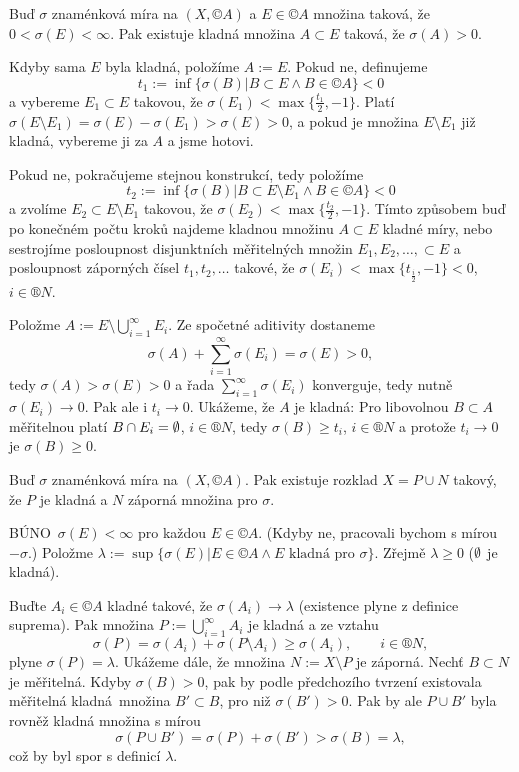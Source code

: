 \documentclass[12pt]{article}					%
\begin{document}
\begin{tvrzeni}
	Buď $\sigma$ znaménková míra na $(X, ©A)$ a $E \in ©A$ množina taková, že $0 < \sigma(E) < ∞$. Pak existuje kladná množina $A \subset E$ taková, že $\sigma(A) > 0$.

	\begin{dukazin}
		Kdyby sama $E$ byla kladná, položíme $A := E$. Pokud ne, definujeme
		$$ t_1 := \inf \{\sigma(B) | B \subset E \land B \in ©A\} < 0 $$
		a vybereme $E_1 \subset E$ takovou, že $\sigma(E_1) < \max \{\frac{t_1}{2}, -1\}$. Platí $\sigma(E \setminus E_1) = \sigma(E) - \sigma(E_1) > \sigma(E) > 0$, a pokud je množina $E \setminus E_1$ již kladná, vybereme ji za $A$ a jsme hotovi.

		Pokud ne, pokračujeme stejnou konstrukcí, tedy položíme
		$$ t_2 := \inf\{\sigma(B) | B \subset E \setminus E_1 \land B\in ©A\} < 0 $$
		a zvolíme $E_2 \subset E \setminus E_1$ takovou, že $\sigma(E_2) < \max\{\frac{t_2}{2}, -1\}$. Tímto způsobem buď po konečném počtu kroků najdeme kladnou množinu $A \subset E$ kladné míry, nebo sestrojíme posloupnost disjunktních měřitelných množin $E_1, E_2, …, \subset E$ a posloupnost záporných čísel $t_1, t_2, …$ takové, že $\sigma(E_i) < \max\{t_\frac{i}{2}, -1\} < 0$, $i \in ®N$.

		Položme $A := E \setminus \bigcup_{i=1}^∞ E_i$. Ze spočetné aditivity dostaneme
		$$ \sigma(A) + \sum_{i=1}^∞ \sigma(E_i) = \sigma(E) > 0, $$
		tedy $\sigma(A) > \sigma(E) > 0$ a řada $\sum_{i=1}^∞ \sigma(E_i)$ konverguje, tedy nutně $\sigma(E_i) \rightarrow 0$. Pak ale i $t_i \rightarrow 0$. Ukážeme, že $A$ je kladná: Pro libovolnou $B \subset A$ měřitelnou platí $B \cap E_i = \emptyset$, $i \in ®N$, tedy $\sigma(B) ≥ t_i$, $i \in ®N$ a protože $t_i \rightarrow 0$ je $\sigma(B) ≥ 0$.
	\end{dukazin}
\end{tvrzeni}

\begin{veta}
	Buď $\sigma$ znaménková míra na $(X, ©A)$. Pak existuje rozklad $X = P \cup N$ takový, že $P$ je kladná a $N$ záporná množina pro $\sigma$.

	\begin{dukazin}
		BÚNO $\sigma(E) < ∞$ pro každou $E \in ©A$. (Kdyby ne, pracovali bychom s mírou $-\sigma$.) Položme $\lambda := \sup\{\sigma(E) | E \in ©A \land E \text{ kladná pro } \sigma\}$. Zřejmě $\lambda ≥ 0$ ($\emptyset$ je kladná).

		Buďte $A_i \in ©A$ kladné takové, že $\sigma(A_i) \rightarrow \lambda$ (existence plyne z definice suprema). Pak množina $P := \bigcup_{i=1}^∞ A_i$ je kladná a ze vztahu
		$$ \sigma(P) = \sigma(A_i) + \sigma(P \setminus A_i) ≥ \sigma(A_i), \qquad i \in ®N, $$
		plyne $\sigma(P) = \lambda$. Ukážeme dále, že množina $N := X \setminus P$ je záporná. Nechť $B \subset N$ je měřitelná. Kdyby $\sigma(B) > 0$, pak by podle předchozího tvrzení existovala měřitelná kladná množina $B' \subset B$, pro niž $\sigma(B') > 0$. Pak by ale $P \cup B'$ byla rovněž kladná množina s mírou
		$$ \sigma(P \cup B') = \sigma(P) + \sigma(B') > \sigma(B) = \lambda, $$
		což by byl spor s definicí $\lambda$.
	\end{dukazin}
\end{veta}
\end{document}
